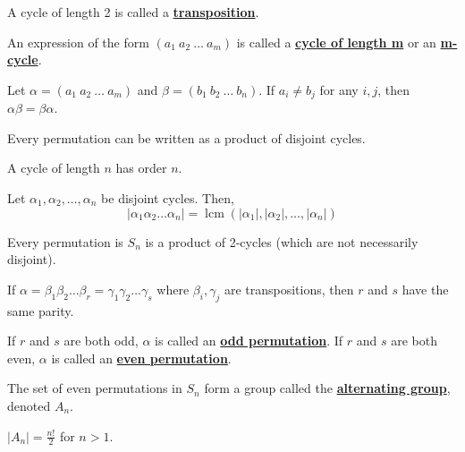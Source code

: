 \documentclass[11pt,letterpaper]{book}
\newcommand{\define}[1]{\underline{\textbf{#1}}}
\DeclareMathOperator{\lcm}{lcm}
\theoremstyle{definition}
\begin{document}
\begin{defi}
    A cycle of length 2 is called a \define{transposition}.
\end{defi}

\begin{defi}
    An expression of the form $(a_1\ a_2\ \ldots\ a_m)$ is called a \define{cycle of length m} or an \define{m-cycle}.
\end{defi}

\begin{prop}
    Let $\alpha=(a_1\ a_2\ \ldots\ a_m)$ and $\beta=(b_1\ b_2\ \ldots\ b_n)$. If $a_i\ne b_j$ for any $i,j$, then $\alpha\beta=\beta\alpha$.
\end{prop}

\begin{prop}
    Every permutation can be written as a product of disjoint cycles.
\end{prop}

\begin{prop}
    A cycle of length $n$ has order $n$.
\end{prop}

\begin{prop}
    Let $\alpha_1,\alpha_2,\ldots,\alpha_n$ be disjoint cycles. Then,
    $$|\alpha_1\alpha_2\ldots\alpha_n|=\lcm(|\alpha_1|,|\alpha_2|,\ldots,|\alpha_n|)$$
\end{prop}

\begin{prop}
    Every permutation is $S_n$ is a product of 2-cycles (which are not necessarily disjoint).
\end{prop}

\begin{prop}
    If $\alpha=\beta_1\beta_2\ldots\beta_r=\gamma_1\gamma_2\ldots\gamma_s$ where $\beta_i,\gamma_j$ are transpositions, then $r$ and $s$ have the same parity.
\end{prop}

\begin{defi}
    If $r$ and $s$ are both odd, $\alpha$ is called an \define{odd permutation}. If $r$ and $s$ are both even, $\alpha$ is called an \define{even permutation}.
\end{defi}

\begin{defi}
    The set of even permutations in $S_n$ form a group called the \define{alternating group}, denoted $A_n$.
\end{defi}

\begin{note}
    $|A_n|=\frac{n!}{2}$ for $n>1$.
\end{note}
\end{document}
